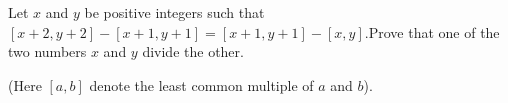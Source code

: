 Let $x $ and $y $ be positive integers such that$[x+2,y+2]-[x+1,y+1]=[x+1,y+1]-[x,y]$.Prove that one of the two numbers $x $ and $y $ divide the other.

(Here $[a,b] $ denote the least common multiple of $a $ and $b $).
